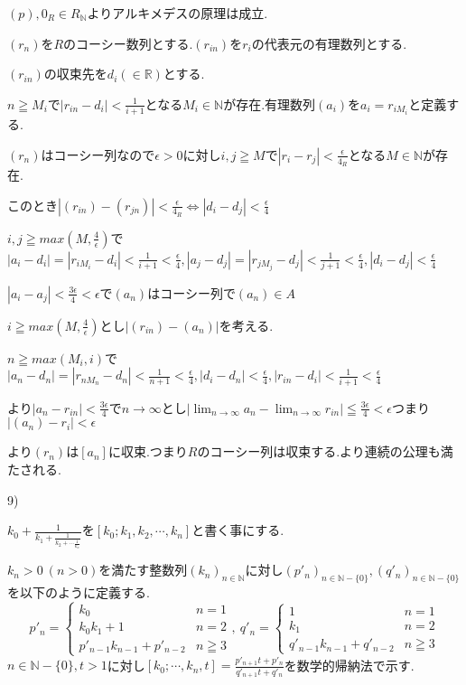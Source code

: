 \documentclass{jsarticle}
\begin{document}
$(p),0_R\in R_{\mathbb{N}}$よりアルキメデスの原理は成立.

$(r_n)$を$R$のコーシー数列とする.$(r_{in})$を$r_i$の代表元の有理数列とする.

$(r_{in})$の収束先を$d_i(\in\mathbb {R})$とする.

$n\geqq M_i$で$|r_{in} - d_i|<\frac{1}{i+1}$となる$M_i\in\mathbb{N}$が存在.有理数列$(a_i)$を$a_i=r_{iM_i}$と定義する.

$(r_n)$はコーシー列なので$\epsilon > 0$に対し$i,j\geqq M$で$|r_i-r_j| < \frac{\epsilon}{4_R}$となる$M\in\mathbb{N}$が存在.

このとき$|(r_{in})-(r_{jn})|<\frac{\epsilon}{4_R}\Leftrightarrow |d_i-d_j|<\frac{\epsilon}{4}$

$i,j\geqq max(M,\frac{4}{\epsilon})$で$|a_i-d_i|=|r_{iM_i}-d_i|<\frac{1}{i+1}<\frac{\epsilon}{4},|a_j-d_j|=|r_{jM_j}-d_j|<\frac{1}{j+1}<\frac{\epsilon}{4},|d_i-d_j|<\frac{\epsilon}{4}$

$|a_i-a_j|<\frac{3\epsilon}{4}<\epsilon$で$(a_n)$はコーシー列で$(a_n)\in A$

$i\geqq max(M,\frac{4}{\epsilon})$とし$|(r_{in})-(a_n)|$を考える.

$n\geqq max(M_i,i)$で$|a_n-d_n|=|r_{nM_n}-d_n|<\frac{1}{n+1}<\frac{\epsilon}{4},|d_i-d_n|<\frac{\epsilon}{4},|r_{in}-d_i|<\frac{1}{i+1}<\frac{\epsilon}{4}$

より$|a_n-r_{in}|<\frac{3\epsilon}{4}$で$n\to\infty$とし$\displaystyle |\lim_{n\to\infty}a_n - \lim_{n\to\infty} r_{in}| \leqq \frac{3\epsilon}{4}<\epsilon$つまり$|(a_n)-r_i|<\epsilon$

より$(r_n)$は$[a_n]$に収束.つまり$R$のコーシー列は収束する.より連続の公理も満たされる.

9)

$k_0+\frac{1}{k_1+\frac{1}{k_2+\cdots \frac{1}{k_n}}}$を$[k_0;k_1,k_2,\cdots,k_n]$と書く事にする.

$k_n>0 \ (n > 0)$を満たす整数列$(k_n)_{n\in\mathbb{N}}$に対し$(p'_n)_{n\in\mathbb{N}-\{0\}},(q'_n)_{n\in\mathbb{N}-\{0\}}$を以下のように定義する.
\[p'_n=\begin{cases}
k_0 & n=1 \\
k_0k_1+1 & n=2 \\
p'_{n-1}k_{n-1}+p'_{n-2} & n\geqq 3
\end{cases}, \ q'_n=\begin{cases}
1 & n=1 \\
k_1 & n=2 \\
q'_{n-1}k_{n-1}+q'_{n-2} & n\geqq 3
\end{cases}\]
$n\in \mathbb{N}-\{0\},t>1$に対し$[k_0;\cdots ,k_n,t]=\frac{p'_{n+1}t+p'_n}{q'_{n+1}t+q'_n}$を数学的帰納法で示す.
\end{document}
